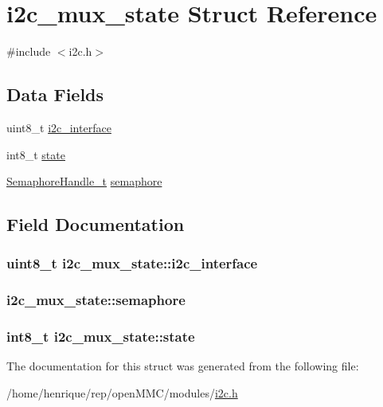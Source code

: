 \hypertarget{structi2c__mux__state}{\section{i2c\-\_\-mux\-\_\-state Struct Reference}
\label{structi2c__mux__state}
}


{\ttfamily \#include $<$i2c.\-h$>$}

\subsection*{Data Fields}
\begin{DoxyCompactItemize}
\item 
uint8\-\_\-t \hyperlink{structi2c__mux__state_a60f15fb5f66d82015a14318650069637}{i2c\-\_\-interface}
\item 
int8\-\_\-t \hyperlink{structi2c__mux__state_aa44992a7171bcefdce923641cc60d01f}{state}
\item 
\hyperlink{semphr_8h_ad88c6df4a04beedeac782918c8a332f5}{Semaphore\-Handle\-\_\-t} \hyperlink{structi2c__mux__state_aadb12b53af0b28a674467fbdda17cfad}{semaphore}
\end{DoxyCompactItemize}


\subsection{Field Documentation}
\hypertarget{structi2c__mux__state_a60f15fb5f66d82015a14318650069637}{
\subsubsection[{i2c\-\_\-interface}]{\setlength{\rightskip}{0pt plus 5cm}uint8\-\_\-t i2c\-\_\-mux\-\_\-state\-::i2c\-\_\-interface}}\label{structi2c__mux__state_a60f15fb5f66d82015a14318650069637}
\hypertarget{structi2c__mux__state_aadb12b53af0b28a674467fbdda17cfad}{
\subsubsection[{semaphore}]{ i2c\-\_\-mux\-\_\-state\-::semaphore}}\label{structi2c__mux__state_aadb12b53af0b28a674467fbdda17cfad}
\hypertarget{structi2c__mux__state_aa44992a7171bcefdce923641cc60d01f}{
\subsubsection[{state}]{\setlength{\rightskip}{0pt plus 5cm}int8\-\_\-t i2c\-\_\-mux\-\_\-state\-::state}}\label{structi2c__mux__state_aa44992a7171bcefdce923641cc60d01f}


The documentation for this struct was generated from the following file\-:\begin{DoxyCompactItemize}
\item 
/home/henrique/rep/open\-M\-M\-C/modules/\hyperlink{i2c_8h}{i2c.\-h}\end{DoxyCompactItemize}
